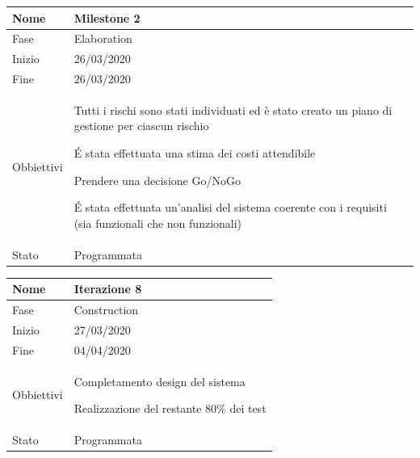 \begin{center}
\begin{tabular}{ |p{2cm}|p{10cm}|  }
\hline
Nome & Milestone 2\\\hline
Fase & Elaboration \\\hline
Inizio & 26/03/2020 \\\hline
Fine &  26/03/2020 \\\hline
Obbiettivi & 
	\begin{compactitem}
		\item Tutti i rischi sono stati individuati ed è stato creato un piano di gestione per ciascun rischio
		\item \'E stata effettuata una stima dei costi attendibile
		\item Prendere una decisione Go/NoGo
		\item \'E stata effettuata un'analisi del sistema coerente con i requisiti (sia funzionali che non funzionali)
	\end{compactitem}\\\hline
Stato &  Programmata \\\hline
\end{tabular}
\label{table:milestone3}\newline

\begin{tabular}{ |p{2cm}|p{10cm}|  }
\hline
Nome & Iterazione 8 \\\hline
Fase & Construction \\\hline
Inizio & 27/03/2020 \\\hline
Fine &  04/04/2020  \\\hline
Obbiettivi & 
	\begin{compactitem}
		\item Completamento design del sistema
		\item Realizzazione del restante 80\% dei test
	\end{compactitem}\\\hline
Stato &  Programmata \\\hline
\end{tabular}
\label{table:8}\newline


\end{center}
